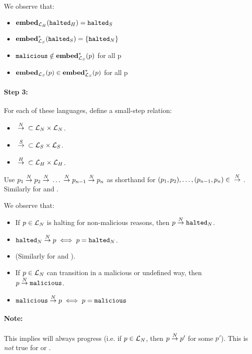 We observe that:

\begin{itemize}
\item ${\mathbf{embed}}_{\mathcal{L}_H}({\mathtt{halted}_H}) = {\mathtt{halted}_S}$
\item $\mathbf{embed}^\ast_{\mathcal{L}_S}({\mathtt{halted}_S}) = \{{\mathtt{halted}_N}\}$
\item ${\mathtt{malicious}} \notin \mathbf{embed}^\ast_{\mathcal{L}_S}(p)$ for all p
\item ${\mathbf{embed}}_{\mathcal{L}_S}(p) \in \mathbf{embed}^\ast_{\mathcal{L}_S}(p)$ for all p
\end{itemize}

\paragraph{Step 3:} For each of these languages, define a small-step relation:

\begin{itemize}
\item ${{}\stackrel{N}{->}{}} \subset \mathcal{L}_N \times \mathcal{L}_N$.
\item ${{}\stackrel{S}{->}{}} \subset \mathcal{L}_S \times \mathcal{L}_S$.
\item ${{}\stackrel{H}{->}{}} \subset \mathcal{L}_H \times \mathcal{L}_H$.
\end{itemize}

Use $p_1 {{}\stackrel{N}{->}{}} p_2 {{}\stackrel{N}{->}{}} \dots {{}\ensuremath{\stackrel{N}{->}}{}} p_{n-1} {{}\stackrel{N}{->}{}} p_n$
as shorthand for $(p_1, p_2), \dots, (p_{n-1}, p_n) \in {{}\ensuremath{\stackrel{N}{->}}{}}$. Similarly
for \simpleo{->} and \higho{->}.

We observe that:

\begin{itemize}
\item If $p \in \mathcal{L}_N$ is halting for non-malicious reasons, then
  $p {{}\stackrel{N}{->}{}} {\mathtt{halted}_N}$.
\item ${\mathtt{halted}_N} {{}\stackrel{N}{->}{}} p \iff p = {\mathtt{halted}_N}$.
\item (Similarly for \simplelang and \highlang).
\item If $p \in \mathcal{L}_N$ can transition in a malicious or undefined way,
  then $p {{}\stackrel{N}{->}{}} {\mathtt{malicious}}$.
\item ${\mathtt{malicious}} {{}\stackrel{N}{->}{}} p \iff p = {\mathtt{malicious}}$
\end{itemize}

\paragraph{Note:} This implies \nativelang will always progress (i.e. if
$p \in \mathcal{L}_N$, then $p {{}\stackrel{N}{->}{}} p'$ for some $p'$). This is \emph{not}
true for \simplelang or \highlang.

